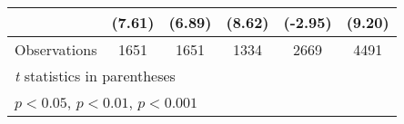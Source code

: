 \begin{table}[htbp]
\begin{tabular}{l*{5}{c}}
                                        &    (7.61)         &    (6.89)         &    (8.62)         &   (-2.95)         &    (9.20)         \\
\midrule
Observations                            &      1651         &      1651         &      1334         &      2669         &      4491         \\
\bottomrule
\multicolumn{6}{l}{\footnotesize \textit{t} statistics in parentheses}\\
\multicolumn{6}{l}{\footnotesize \sym{*} \(p<0.05\), \sym{**} \(p<0.01\), \sym{***} \(p<0.001\)}\\
\end{tabular}
\end{table}
